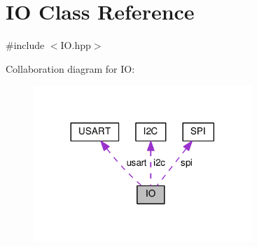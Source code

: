 \hypertarget{classIO}{}\section{IO Class Reference}
\label{classIO}


{\ttfamily \#include $<$I\+O.\+hpp$>$}



Collaboration diagram for IO\+:\nopagebreak
\begin{figure}[H]
\begin{center}
\leavevmode
\includegraphics[width=233pt]{classIO__coll__graph}
\end{center}
\end{figure}
